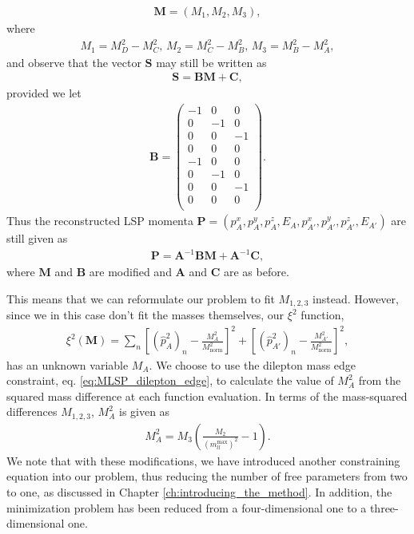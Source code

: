 \documentclass[twoside,english]{uiofysmaster}
\begin{document}
\begin{align}
	\mathbf{M} = (M_1, M_2, M_3),
\end{align}
where
\begin{align}
	M_1 = M_D^2 - M_C^2, \, M_2 = M_C^2 - M_B^2, \, M_3 = M_B^2 - M_A^2,
\end{align}
and observe that the vector $\mathbf{S}$ may still be written as
\begin{align}
	\mathbf{S} = \mathbf{B}\mathbf{M} + \mathbf{C},
\end{align}
provided we let
\begin{align}
	\mathbf{B} = \begin{pmatrix}
					-1 & 0 & 0 \\
					0 & -1 & 0 \\
					0 & 0 & -1 \\
					0 & 0 & 0 \\
					-1 & 0 & 0  \\
					0 & -1 & 0  \\
					0 & 0 & -1  \\
					0 & 0 & 0 \\
	\end{pmatrix}.
\end{align}
Thus the reconstructed LSP momenta $\mathbf{P} = (p_A^x, p_A^y, p_A^z, E_A, p_{A'}^x, p_{A'}^y, p_{A'}^z, E_{A'})$ are still given as 
\begin{align}
	\mathbf{P} = \mathbf{A}^{-1}\mathbf{B}\mathbf{M} + \mathbf{A}^{-1}\mathbf{C},
\end{align}
where $\mathbf{M}$ and $\mathbf{B}$ are modified and $\mathbf{A}$ and $\mathbf{C}$ are as before.

This means that we can reformulate our problem to fit $M_{1,2,3}$ instead. However, since we in this case don't fit the masses themselves, our $\xi^2$ function,
\begin{align}
	\xi^2(\mathbf{M}) = \sum_n \left[(\hat p_{A}^2)_n - \frac{M_A^2}{M_\mathrm{norm}^2}\right]^2 + \left[(\hat p_{A'}^2)_n - \frac{M_{A'}^2}{M_\mathrm{norm}^2}\right]^2,\label{eq:xisquared_modified_repeat}
\end{align} 
has an unknown variable $M_A$. We choose to use the dilepton mass edge constraint, eq. \eqref{eq:MLSP_dilepton_edge}, to calculate the value of $M_A^2$ from the squared mass difference at each function evaluation. In terms of the mass-squared differences $M_{1,2,3}$, $M_A^2$ is given as
\begin{align}
	M_A^2 = M_3\left( \frac{M_2}{(m_{ll}^\mathrm{max})^ 2} - 1 \right).
\end{align}
We note that with these modifications, we have introduced another constraining equation into our problem, thus reducing the number of free parameters from two to one, as discussed in Chapter \ref{ch:introducing_the_method}. In addition, the minimization problem has been reduced from a four-dimensional one to a three-dimensional one. 
\end{document}
